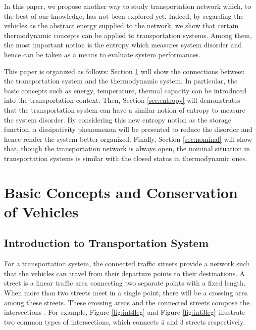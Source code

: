 \documentclass[preprint,authoryear,12pt]{elsarticle}
\begin{document}
In this paper, we propose another way to study transportation network which, to the best of our knowledge,  has not been explored yet. Indeed, by regarding the vehicles as the abstract energy supplied to the network, we show that certain thermodynamic concepts can be applied to transportation systems. Among them, the most important notion is the entropy which measures system disorder and hence can be taken as a means to evaluate system performances.

This paper is organized as follows: Section \ref{sec:concepts} will show the connections between the transportation system and the thermodynamic system. In particular, the basic concepts such as energy, temperature, thermal capacity can be introduced into the transportation context. Then, Section \ref{sec:entropy} will demonstrates that the transportation system can have a similar notion of entropy to measure the system disorder. By considering this new entropy notion as the storage function, a dissipativity phenomenon will be presented to reduce the disorder and hence render the system better organized. Finally, Section \ref{sec:nominal} will show that, though the transportation network is always open, the nominal situation in transportation systems is similar with the closed status in thermodynamic ones.

\section{Basic Concepts and Conservation of Vehicles}\label{sec:concepts}

\subsection{Introduction to Transportation System}

For a transportation system, the connected traffic streets provide a network such that the vehicles can travel from their departure points to their destinations.
A street is a linear traffic area connecting two separate points with a fixed length. When more than two streets meet in a single point, there will be a crossing area among these streets. These crossing areas and the connected streets compose the intersections \citep{papageorgiou_review_2003}. For example, Figure \ref{fig:int4leg} and Figure \ref{fig:int3leg} illustrate two common types of intersections, which connects 4 and 3 streets respectively.
\end{document}
